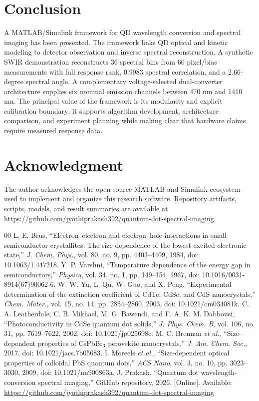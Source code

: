 \documentclass[conference]{IEEEtran}
\begin{document}
\section{Conclusion}
A MATLAB/Simulink framework for QD wavelength conversion and spectral imaging has been presented. The framework links QD optical and kinetic modeling to detector observation and inverse spectral reconstruction. A synthetic SWIR demonstration reconstructs 36 spectral bins from 60 pixel/bias measurements with full response rank, 0.9983 spectral correlation, and a 2.66-degree spectral angle. A complementary voltage-selected dual-converter architecture supplies six nominal emission channels between 470 nm and 1410 nm. The principal value of the framework is its modularity and explicit calibration boundary: it supports algorithm development, architecture comparison, and experiment planning while making clear that hardware claims require measured response data.

\section*{Acknowledgment}
The author acknowledges the open-source MATLAB and Simulink ecosystem used to implement and organize this research software. Repository artifacts, scripts, models, and result summaries are available at \url{https://github.com/jyothiprakash392/quantum-dot-spectral-imaging}.

\begin{thebibliography}{00}
 L. E. Brus, ``Electron--electron and electron--hole interactions in small semiconductor crystallites: The size dependence of the lowest excited electronic state,'' \emph{J. Chem. Phys.}, vol. 80, no. 9, pp. 4403--4409, 1984, doi: 10.1063/1.447218.
 Y. P. Varshni, ``Temperature dependence of the energy gap in semiconductors,'' \emph{Physica}, vol. 34, no. 1, pp. 149--154, 1967, doi: 10.1016/0031-8914(67)90062-6.
 W. W. Yu, L. Qu, W. Guo, and X. Peng, ``Experimental determination of the extinction coefficient of CdTe, CdSe, and CdS nanocrystals,'' \emph{Chem. Mater.}, vol. 15, no. 14, pp. 2854--2860, 2003, doi: 10.1021/cm034081k.
 C. A. Leatherdale, C. B. Mikhael, M. G. Bawendi, and F. A. K. M. Dabbousi, ``Photoconductivity in CdSe quantum dot solids,'' \emph{J. Phys. Chem. B}, vol. 106, no. 31, pp. 7619--7622, 2002, doi: 10.1021/jp025698c.
 M. C. Brennan \emph{et al.}, ``Size-dependent properties of CsPbBr$_3$ perovskite nanocrystals,'' \emph{J. Am. Chem. Soc.}, 2017, doi: 10.1021/jacs.7b05683.
 I. Moreels \emph{et al.}, ``Size-dependent optical properties of colloidal PbS quantum dots,'' \emph{ACS Nano}, vol. 3, no. 10, pp. 3023--3030, 2009, doi: 10.1021/nn900863a.
 J. Prakash, ``Quantum dot wavelength-conversion spectral imaging,'' GitHub repository, 2026. [Online]. Available: \url{https://github.com/jyothiprakash392/quantum-dot-spectral-imaging}
\end{thebibliography}
\end{document}
